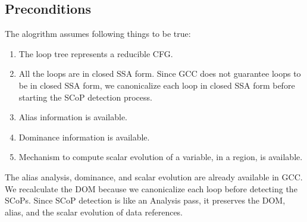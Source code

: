\documentclass{sigplanconf}
\begin{document}
\subsection{Preconditions}
The alogrithm assumes following things to be true:
\begin{enumerate}
\item The loop tree represents a reducible CFG.
\item All the loops are in closed SSA form. Since GCC does not guarantee
loops to be in closed SSA form, we canonicalize each loop in closed SSA form
before starting the SCoP detection process.
\item Alias information is available.
\item Dominance information is available.
\item Mechanism to compute scalar evolution of a variable, in a region, is
  available.
\end{enumerate}

The alias analysis, dominance, and scalar evolution are already available in
GCC.  We recalculate the DOM because we canonicalize each loop before detecting
the SCoPs.  Since SCoP detection is like an Analysis pass, it preserves the DOM,
alias, and the scalar evolution of data references.
\end{document}
